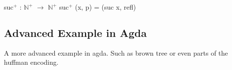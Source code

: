 \begin{codesnippet}[mathescape=true, caption={Successor of $\mathbb{N}^+$}, label={codeSnippet:nonzero_natural_number_suc}]
suc$^+$ : $\mathbb{N}^+$ $\rightarrow$ $\mathbb{N}^+$
suc$^+$ (x, p) = (suc x, refl)
\end{codesnippet}

\subsection{Advanced Example in Agda}
A more advanced example in agda. Such as brown tree or even parts of the huffman encoding.